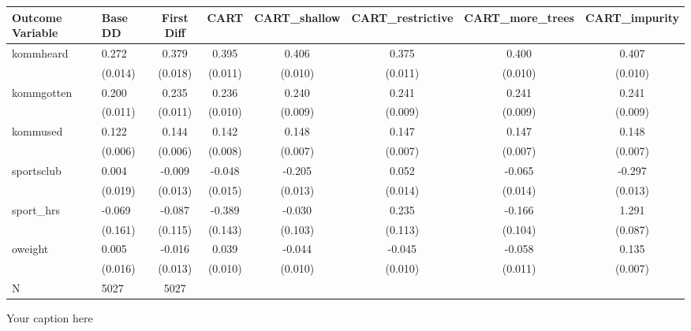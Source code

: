 \begin{adjustbox}{angle=90}
\begin{tabular}{llcccccc}
\hline
Outcome Variable & Base DD & First Diff & CART & CART_shallow & CART_restrictive & CART_more_trees & CART_impurity \\
\hline
kommheard & 0.272 & 0.379 & 0.395 & 0.406 & 0.375 & 0.400 & 0.407 \\
  & (0.014) & (0.018) & (0.011) & (0.010) & (0.011) & (0.010) & (0.010) \\
kommgotten & 0.200 & 0.235 & 0.236 & 0.240 & 0.241 & 0.241 & 0.241 \\
  & (0.011) & (0.011) & (0.010) & (0.009) & (0.009) & (0.009) & (0.009) \\
kommused & 0.122 & 0.144 & 0.142 & 0.148 & 0.147 & 0.147 & 0.148 \\
  & (0.006) & (0.006) & (0.008) & (0.007) & (0.007) & (0.007) & (0.007) \\
sportsclub & 0.004 & -0.009 & -0.048 & -0.205 & 0.052 & -0.065 & -0.297 \\
  & (0.019) & (0.013) & (0.015) & (0.013) & (0.014) & (0.014) & (0.013) \\
sport_hrs & -0.069 & -0.087 & -0.389 & -0.030 & 0.235 & -0.166 & 1.291 \\
  & (0.161) & (0.115) & (0.143) & (0.103) & (0.113) & (0.104) & (0.087) \\
oweight & 0.005 & -0.016 & 0.039 & -0.044 & -0.045 & -0.058 & 0.135 \\
  & (0.016) & (0.013) & (0.010) & (0.010) & (0.010) & (0.011) & (0.007) \\
\hline
N & 5027 & 5027  &  &  &  &  \\
\hline
\end{tabular}
\caption{Your caption here}
\label{tab:your_label}
\end{adjustbox}